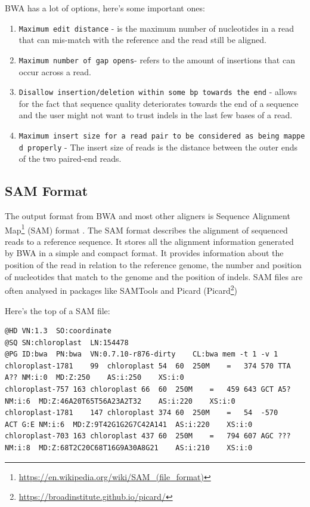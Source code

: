 \documentclass[12pt,]{book}
\providecommand{\tightlist}{%
  \setlength{\itemsep}{0pt}\setlength{\parskip}{0pt}}
\let\rmarkdownfootnote\footnote%
\def\footnote{\protect\rmarkdownfootnote}
\renewcommand{\href}[2]{#2\footnote{\url{#1}}}
\begin{document}
BWA has a lot of options, here's some important ones:

\begin{enumerate}
\def\labelenumi{\arabic{enumi}.}
\tightlist
\item
  \texttt{Maximum\ edit\ distance} - is the maximum number of
  nucleotides in a read that can mis-match with the reference and the
  read still be aligned.
\item
  \texttt{Maximum\ number\ of\ gap\ opens}- refers to the amount of
  insertions that can occur across a read.
\item
  \texttt{Disallow\ insertion/deletion\ within\ some\ bp\ towards\ the\ end}
  - allows for the fact that sequence quality deteriorates towards the
  end of a sequence and the user might not want to trust indels in the
  last few bases of a read.
\item
  \texttt{Maximum\ insert\ size\ for\ a\ read\ pair\ to\ be\ considered\ as\ being\ mapped\ properly}
  - The insert size of reads is the distance between the outer ends of
  the two paired-end reads.
\end{enumerate}

\subsection{SAM Format}\label{sam-format}

The output format from BWA and most other aligners is
\href{https://en.wikipedia.org/wiki/SAM_(file_format)}{Sequence
Alignment Map} (SAM) format \citep{Li:2009ka}. The SAM format describes
the alignment of sequenced reads to a reference sequence. It stores all
the alignment information generated by BWA in a simple and compact
format. It provides information about the position of the read in
relation to the reference genome, the number and position of nucleotides
that match to the genome and the position of indels. SAM files are often
analysed in packages like SAMTools \citep{Li:2009ka} and Picard
(\href{https://broadinstitute.github.io/picard/}{Picard})

Here's the top of a SAM file:

\begin{verbatim}
@HD VN:1.3  SO:coordinate
@SQ SN:chloroplast  LN:154478
@PG ID:bwa  PN:bwa  VN:0.7.10-r876-dirty    CL:bwa mem -t 1 -v 1
chloroplast-1781    99  chloroplast 54  60  250M    =   374 570 TTA A?? NM:i:0  MD:Z:250    AS:i:250    XS:i:0
chloroplast-757 163 chloroplast 66  60  250M    =   459 643 GCT A5? NM:i:6  MD:Z:46A20T65T56A23A2T32    AS:i:220    XS:i:0
chloroplast-1781    147 chloroplast 374 60  250M    =   54  -570    ACT G:E NM:i:6  MD:Z:9T42G1G2G7C42A141  AS:i:220    XS:i:0
chloroplast-703 163 chloroplast 437 60  250M    =   794 607 AGC ??? NM:i:8  MD:Z:68T2C20C68T16G9A30A8G21    AS:i:210    XS:i:0
\end{verbatim}
\end{document}
